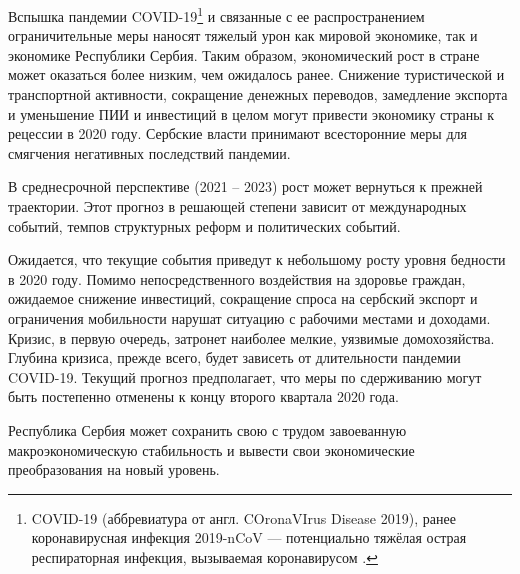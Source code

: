 Вспышка пандемии COVID-19\footnote{COVID-19 (аббревиатура от англ. COronaVIrus Disease 2019), ранее коронавирусная инфекция 2019-nCoV — потенциально тяжёлая острая респираторная инфекция, вызываемая коронавирусом \cite{wiki_covid}.} и связанные с ее распространением ограничительные меры наносят тяжелый урон как мировой экономике, так и экономике Республики Сербия.
Таким образом, экономический рост в стране может оказаться более низким, чем ожидалось ранее.
Снижение туристической и транспортной активности, сокращение денежных переводов, замедление экспорта и уменьшение ПИИ и инвестиций в целом могут привести экономику страны к рецессии в 2020 году.
Сербские власти принимают всесторонние меры для смягчения негативных последствий пандемии.

В среднесрочной перспективе (2021 -- 2023) рост может вернуться к прежней траектории.
Этот прогноз в решающей степени зависит от международных событий, темпов структурных реформ и политических событий.

Ожидается, что текущие события приведут к небольшому росту уровня бедности в 2020 году.
Помимо непосредственного воздействия на здоровье граждан, ожидаемое снижение инвестиций, сокращение спроса на сербский экспорт и ограничения мобильности нарушат ситуацию с рабочими местами и доходами.
Кризис, в первую очередь, затронет наиболее мелкие, уязвимые домохозяйства.
Глубина кризиса, прежде всего, будет зависеть от длительности пандемии COVID-19.
Текущий прогноз предполагает, что меры по сдерживанию могут быть постепенно отменены к концу второго квартала 2020 года.

Республика Сербия может сохранить свою с трудом завоеванную макроэкономическую стабильность и вывести свои экономические преобразования на новый уровень.
